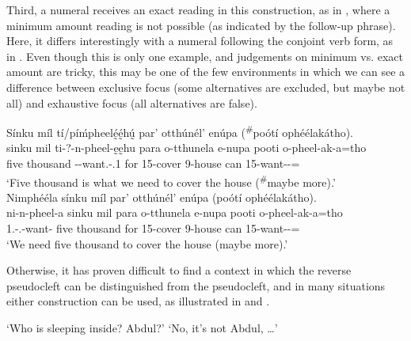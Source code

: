 \documentclass[output=paper]{langscibook}
\begin{document}
\z

Third, a numeral receives an exact reading in this construction, as in , where a minimum amount reading is not possible (as indicated by the follow-up phrase). Here, it differs interestingly with a numeral following the conjoint verb form, as in . Even though this is only one example, and judgements on minimum vs. exact amount are tricky, this may be one of the few environments in which we can see a difference between exclusive focus (some alternatives are excluded, but maybe not all) and exhaustive focus (all alternatives are false).


\ea
\label{bkm:Ref110414003}
Sínku míl tí/píḿpheelḛ́ḛ́hṵ́ par’ otthúnél’ enúpa (\textsuperscript{\#}poótí ophéélakátho).\\
\gll
sinku  mil  ti-?-n-pheel-ḛḛhu  para  o-tthunela  e-nupa  pooti  o-pheel-ak-a=tho \\
five  thousand  \COP{}-\PRS{}-want.\REL{}-\POSS{}.1\PL{}  for  15-cover  9-house can  15-want-\DUR{}-\FV{}=\REP{} \\
\glt
‘Five thousand is what we need to cover the house (\textsuperscript{\#}maybe more).’\\

\ex
\label{bkm:Ref110413993}
Nimphééla sínku míl par’ otthúnél’ enúpa (poótí ophéélakátho).\\
\gll
ni-n-pheel-a  sinku  mil  para  o-tthunela  e-nupa pooti  o-pheel-ak-a=tho \\
1\PL{}.\SM{}-\PRS{}.\CJ{}-{}want-\FV{}  five  thousand  for  15-cover  9-house can  15-want-\DUR{}-\FV{}=\REP{} \\
\glt
‘We need five thousand to cover the house (maybe more).’\\

\z



Otherwise, it has proven difficult to find a context in which the reverse pseudocleft can be distinguished from the pseudocleft, and in many situations either construction can be used, as illustrated in  and .\largerpage


\ea
\label{bkm:Ref96776086}
\begin{xlist} 
 ‘Who is sleeping inside? Abdul?’
 ‘No, it’s not Abdul, …’
\end{xlist}
\end{document}
